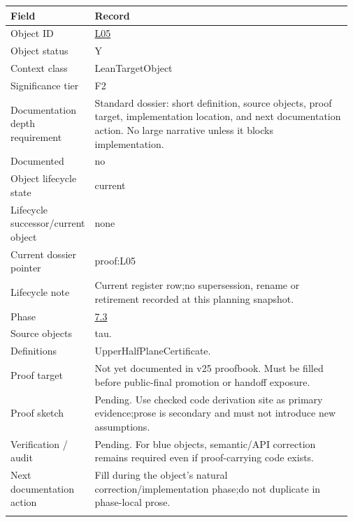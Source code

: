 \begin{longtable}{L{0.16\linewidth} L{0.81\linewidth}}
\hline
\textbf{Field} & \textbf{Record}\\
\hline
Object ID & \hyperlink{object-row-L05}{L05}\\
\hline\addlinespace[0.20em]
Object status & Y\\
\hline\addlinespace[0.20em]
Context class & LeanTargetObject\\
\hline\addlinespace[0.20em]
Significance tier & F2\\
\hline\addlinespace[0.20em]
Documentation depth requirement & Standard dossier: short definition, source objects, proof target, implementation location, and next documentation action. No large narrative unless it blocks implementation.\\
\hline\addlinespace[0.20em]
Documented & no\\
\hline\addlinespace[0.20em]
Object lifecycle state & current\\
\hline\addlinespace[0.20em]
Lifecycle successor/\allowbreak{}current object & none\\
\hline\addlinespace[0.20em]
Current dossier pointer & proof:L05\\
\hline\addlinespace[0.20em]
Lifecycle note & Current register row;\newline no supersession, rename or retirement recorded at this planning snapshot.\\
\hline\addlinespace[0.20em]
Phase & \hyperlink{phase-row-7-3}{7.3}\\
\hline\addlinespace[0.20em]
Source objects & tau.\\
\hline\addlinespace[0.20em]
Definitions & UpperHalfPlaneCertificate.\\
\hline\addlinespace[0.20em]
Proof target & Not yet documented in v25 proofbook. Must be filled before public-final promotion or handoff exposure.\\
\hline\addlinespace[0.20em]
Proof sketch & Pending. Use checked code derivation site as primary evidence;\newline prose is secondary and must not introduce new assumptions.\\
\hline\addlinespace[0.20em]
Verification /\allowbreak{} audit & Pending. For blue objects, semantic/\allowbreak{}API correction remains required even if proof-carrying code exists.\\
\hline\addlinespace[0.20em]
Next documentation action & Fill during the object's natural correction/\allowbreak{}implementation phase;\newline do not duplicate in phase-local prose.\\
\hline\addlinespace[0.20em]
\end{longtable}
